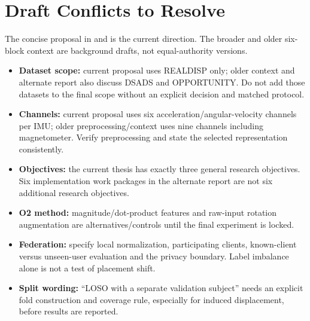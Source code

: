\documentclass[10pt,a4paper]{article}
\begin{document}
\section{Draft Conflicts to Resolve}
The concise proposal in  and  is the current direction. The broader  and older six-block context are background drafts, not equal-authority versions.
\begin{itemize}
\item \textbf{Dataset scope:} current proposal uses REALDISP only; older context and alternate report also discuss DSADS and OPPORTUNITY. Do not add those datasets to the final scope without an explicit decision and matched protocol.
\item \textbf{Channels:} current proposal uses six acceleration/angular-velocity channels per IMU; older preprocessing/context uses nine channels including magnetometer. Verify preprocessing and state the selected representation consistently.
\item \textbf{Objectives:} the current thesis has exactly three general research objectives. Six implementation work packages in the alternate report are not six additional research objectives.
\item \textbf{O2 method:} magnitude/dot-product features and raw-input rotation augmentation are alternatives/controls until the final experiment is locked.
\item \textbf{Federation:} specify local normalization, participating clients, known-client versus unseen-user evaluation and the privacy boundary. Label imbalance alone is not a test of placement shift.
\item \textbf{Split wording:} ``LOSO with a separate validation subject'' needs an explicit fold construction and coverage rule, especially for induced displacement, before results are reported.
\end{itemize}
\end{document}
